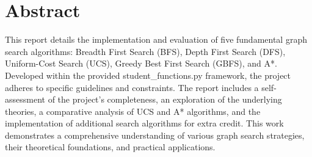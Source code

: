 \section{Abstract}

\qquad This report details the implementation and evaluation of five fundamental graph search algorithms: Breadth First Search (BFS), Depth First Search (DFS), Uniform-Cost Search (UCS), Greedy Best First Search (GBFS), and A*. Developed within the provided student\_functions.py framework, the project adheres to specific guidelines and constraints. The report includes a self-assessment of the project's completeness, an exploration of the underlying theories, a comparative analysis of UCS and A* algorithms, and the implementation of additional search algorithms for extra credit. This work demonstrates a comprehensive understanding of various graph search strategies, their theoretical foundations, and practical applications.

\pagebreak